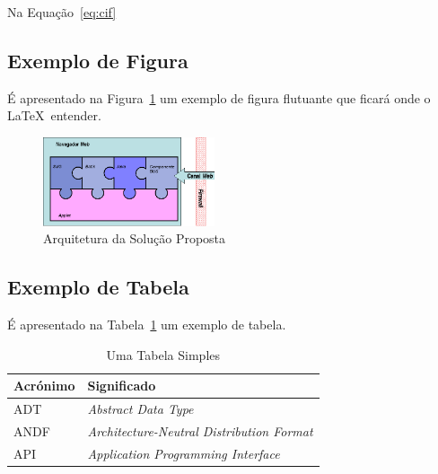 \documentclass[twocolumn,twoside,11pt,a4paper]{article}
\begin{document}
Na Equação~\ref{eq:cif} \lipsum[5]

\subsection{Exemplo de Figura}

É apresentado na Figura~\ref{fig:arch} %
um exemplo de figura flutuante que ficará onde o \LaTeX\ entender.

\begin{figure}
  \begin{center}
    \leavevmode
    \includegraphics[width=0.45\textwidth]{puzzle}
    \caption{Arquitetura da Solução Proposta}
    \label{fig:arch}
  \end{center}
\end{figure}

\lipsum[6]

\subsection{Exemplo de Tabela}

É apresentado na Tabela~\ref{tab:exemplo1} um exemplo de tabela.

\begin{table}[H]
  \centering
  \caption{Uma Tabela Simples}
  \begin{tabular}{| l | p{45mm} |}
    \hline
    \textbf{Acrónimo} & \textbf{Significado}\\
    \hline
    \hline
    ADT   & \emph{Abstract Data Type}\\\hline
    ANDF  & \emph{Architecture-Neutral Distribution Format}\\\hline
    API   & \emph{Application Programming Interface}\\
    \hline
  \end{tabular}
  \label{tab:exemplo1}
\end{table}

\lipsum[7]
\end{document}
